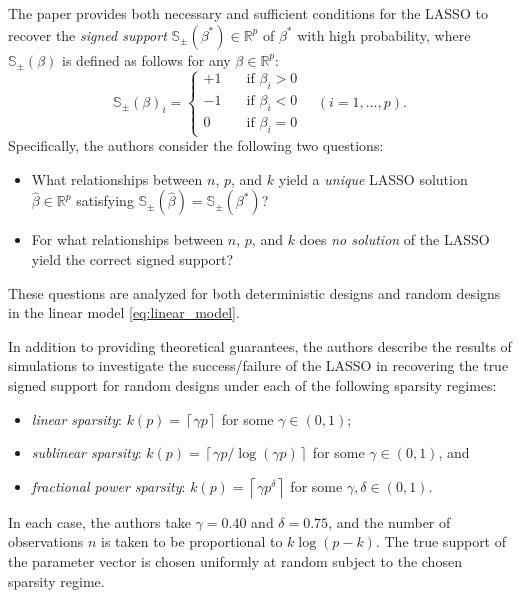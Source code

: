 \documentclass[letterpaper,12pt]{article}
\newcommand{\ceil}[1]{\left\lceil#1\right\rceil}
\begin{document}
The paper \cite{wainwright06} provides both necessary and sufficient
conditions for the LASSO to recover the \textit{signed support}
$\mathbb{S}_\pm(\beta^\ast) \in \mathbb{R}^p$ of $\beta^\ast$ with
high probability, where $\mathbb{S}_\pm(\beta)$ is defined as follows
for any $\beta \in \mathbb{R}^p$:
\begin{equation*}
  \mathbb{S}_\pm(\beta)_i =
  \begin{cases}
    +1 & \quad \text{if $\beta_i > 0$} \\
    -1 & \quad \text{if $\beta_i < 0$} \\
    0 & \quad \text{if $\beta_i = 0$}
  \end{cases}
  \quad (i = 1, \ldots, p).
\end{equation*}
Specifically, the authors consider the following two questions:
\begin{itemize}
\item What relationships between $n$, $p$, and $k$ yield a
  \emph{unique} LASSO solution $\hat{\beta} \in \mathbb{R}^p$
  satisfying
  $\mathbb{S}_\pm(\hat{\beta}) = \mathbb{S}_\pm(\beta^\ast)$?
\item For what relationships between $n$, $p$, and $k$ does \emph{no
    solution} of the LASSO yield the correct signed support?
\end{itemize}
These questions are analyzed for both deterministic designs and random
designs in the linear model \eqref{eq:linear_model}.

In addition to providing theoretical guarantees, the authors describe
the results of simulations to investigate the success/failure of the
LASSO in recovering the true signed support for random designs under
each of the following sparsity regimes:
\begin{itemize}
\item \textit{linear sparsity}: $k(p) = \ceil{\gamma p}$ for some
  $\gamma \in (0, 1)$;
\item \textit{sublinear sparsity}:
  $k(p) = \ceil{\gamma p / \log(\gamma p)}$ for some
  $\gamma \in (0, 1)$, and
\item \textit{fractional power sparsity}:
  $k(p) = \ceil{\gamma p^\delta}$ for some
  $\gamma, \delta \in (0, 1)$.
\end{itemize}
In each case, the authors take $\gamma = 0.40$ and $\delta = 0.75$,
and the number of observations $n$ is taken to be proportional to
$k\log(p - k)$. The true support of the parameter vector is chosen
uniformly at random subject to the chosen sparsity regime.
\end{document}
